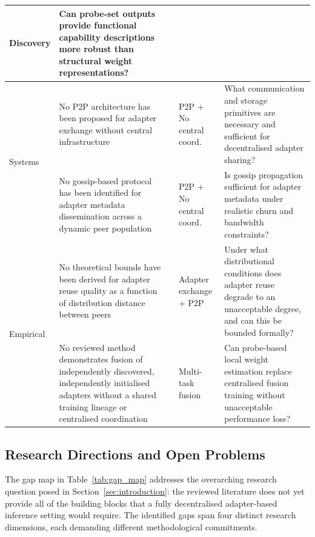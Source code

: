 \begin{table}[H]
\begin{tabular}{p{1.9cm}p{3.3cm}p{2cm}p{1.9cm}p{3.9cm}}
  Discovery &
  Can probe-set outputs provide functional capability descriptions more robust
  than structural weight representations? \\
\midrule
\multirow{2}{*}{Systems} &
  No P2P architecture has been proposed for adapter exchange without central infrastructure &
  \cite{Sheng2024,Chen2023Punica,Li2024CaraServe,Borzunov2023} &
  P2P + No central coord. &
  What communication and storage primitives are necessary and sufficient for
  decentralised adapter sharing? \\[4pt]
  &
  No gossip-based protocol has been identified for adapter metadata dissemination across
  a dynamic peer population &
  \cite{OrmandyGossip2013,HegeduisGossip2019} &
  P2P + No central coord. &
  Is gossip propagation sufficient for adapter metadata under realistic churn
  and bandwidth constraints? \\
\midrule
\multirow{2}{*}{Empirical} &
  No theoretical bounds have been derived for adapter reuse quality as a function of
  distribution distance between peers &
  \cite{ZhangFedPETuning2023,Li2020FedProx,BenDavid2010} &
  Adapter exchange + P2P &
  Under what distributional conditions does adapter reuse degrade to an
  unacceptable degree, and can this be bounded formally? \\[4pt]
  &
  No reviewed method demonstrates fusion of independently discovered,
  independently initialised adapters without a shared training lineage or
  centralised coordination &
  \cite{Pfeiffer2021fusion,Ilharco2023TaskArithmetic,Yadav2023TIES} &
  Multi-task fusion &
  Can probe-based local weight estimation replace centralised fusion training
  without unacceptable performance loss? \\
\bottomrule
\end{tabular}
\end{table}

\subsection{Research Directions and Open Problems}
\label{sec:synthesis_gap:directions}

The gap map in Table~\ref{tab:gap_map} addresses the overarching research question posed in Section~\ref{sec:introduction}: the reviewed literature does not yet provide all of the building blocks that a fully decentralised adapter-based inference setting would require. The identified gaps span four distinct research dimensions, each demanding different methodological commitments.

